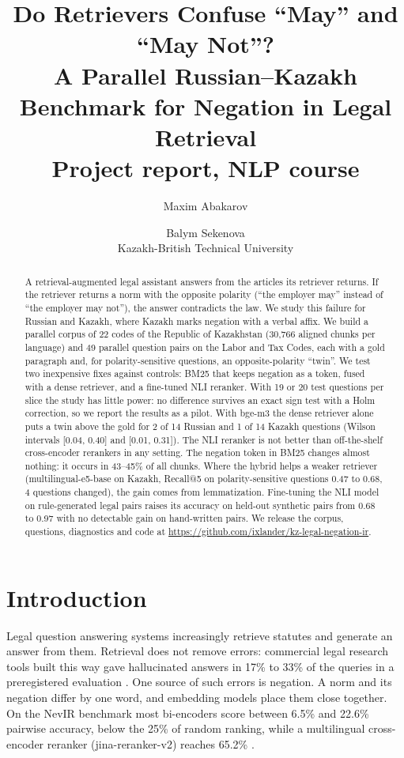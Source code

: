 \documentclass[11pt]{article}
\title{Do Retrievers Confuse ``May'' and ``May Not''?\\
A Parallel Russian--Kazakh Benchmark for Negation in Legal Retrieval\\[4pt]
\large Project report, NLP course}
\author{Maxim Abakarov \and Balym Sekenova \\
  Kazakh-British Technical University}
\begin{document}
\maketitle

\begin{abstract}
A retrieval-augmented legal assistant answers from the articles its retriever returns. If the retriever
returns a norm with the opposite polarity (``the employer may'' instead of ``the employer may not''), the
answer contradicts the law. We study this failure for Russian and Kazakh, where Kazakh marks negation with a
verbal affix. We build a parallel corpus of 22 codes of the Republic of Kazakhstan (30,766 aligned chunks per
language) and 49 parallel question pairs on the Labor and Tax Codes, each with a gold paragraph and, for
polarity-sensitive questions, an opposite-polarity ``twin''. We test two inexpensive fixes against controls:
BM25 that keeps negation as a token, fused with a dense retriever, and a fine-tuned NLI reranker. With
19 or 20 test questions per slice the study has little power: no difference survives an exact sign test
with a Holm correction, so we report the results as a pilot. With bge-m3 the dense retriever alone puts a
twin above the gold for 2 of 14 Russian and 1 of 14 Kazakh questions (Wilson intervals [0.04, 0.40] and
[0.01, 0.31]). The NLI reranker is not better than off-the-shelf cross-encoder rerankers in any setting.
The negation token in BM25 changes almost nothing: it occurs in 43--45\% of all chunks. Where the hybrid
helps a weaker retriever (multilingual-e5-base on Kazakh, Recall@5 on polarity-sensitive questions 0.47 to
0.68, 4 questions changed), the gain comes from lemmatization. Fine-tuning the NLI model on rule-generated
legal pairs raises its accuracy on held-out synthetic pairs from 0.68 to 0.97 with no detectable gain on
hand-written pairs. We release the corpus, questions, diagnostics and code at
\url{https://github.com/ixlander/kz-legal-negation-ir}.
\end{abstract}

\section{Introduction}

Legal question answering systems increasingly retrieve statutes and generate an answer from them.
Retrieval does not remove errors: commercial legal research tools built this way gave hallucinated answers in
17\% to 33\% of the queries in a preregistered evaluation \citep{magesh2024hallucination}. One source of such
errors is negation. A norm and its negation differ by one word, and embedding models place them close
together. On the NevIR benchmark \citep{weller-etal-2024-nevir} most bi-encoders score between 6.5\% and 22.6\% pairwise accuracy, below
the 25\% of random ranking, while a multilingual cross-encoder reranker (jina-reranker-v2) reaches 65.2\%
\citep{vandenelsen2025nevir}.
\end{document}
